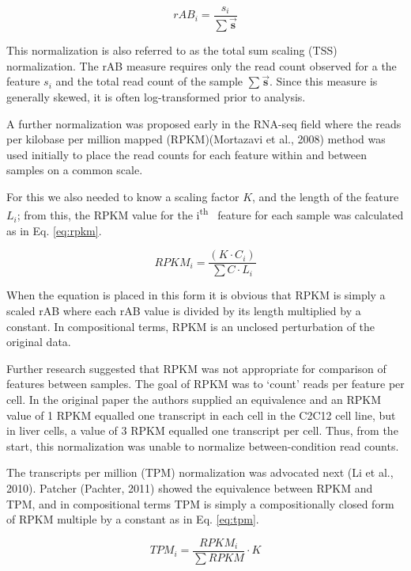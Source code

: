 \documentclass[twocolumn]{article}
\newcommand{\ith}[1]{ #1\textsuperscript{th}\ }
\begin{document}
\begin{equation}
    rAB_{i} = \frac{s_{i}}{\sum{\vec{\textbf{s}}}}
    \label{eq:rab}
\end{equation}

This normalization is also referred to as the total sum scaling (TSS)
normalization. The rAB measure requires only the read count observed for
a the feature \(s_i\) and the total read count of the sample
\(\sum{\vec{\textbf{s}}}\). Since this measure is generally skewed, it
is often log-transformed prior to analysis.

A further normalization was proposed early in the RNA-seq field where
the reads per kilobase per million mapped (RPKM)(Mortazavi et al., 2008)
method was used initially to place the read counts for each feature
within and between samples on a common scale.

For this we also needed to know a scaling factor \(K\), and the length
of the feature \(L_i\); from this, the RPKM value for the \ith{i}
feature for each sample was calculated as in Eq. \ref{eq:rpkm}.

\begin{equation}
    RPKM_{i} = \frac{(K \cdot C_{i} )}{\sum{C} \cdot L_{i}}
    \label{eq:rpkm}
\end{equation}

When the equation is placed in this form it is obvious that RPKM is
simply a scaled rAB where each rAB value is divided by its length
multiplied by a constant. In compositional terms, RPKM is an unclosed
perturbation of the original data.

Further research suggested that RPKM was not appropriate for comparison
of features between samples. The goal of RPKM was to `count' reads per
feature per cell. In the original paper the authors supplied an
equivalence and an RPKM value of 1 RPKM equalled one transcript in each
cell in the C2C12 cell line, but in liver cells, a value of 3 RPKM
equalled one transcript per cell. Thus, from the start, this
normalization was unable to normalize between-condition read counts.

The transcripts per million (TPM) normalization was advocated next (Li
et al., 2010). Patcher (Pachter, 2011) showed the equivalence between
RPKM and TPM, and in compositional terms TPM is simply a compositionally
closed form of RPKM multiple by a constant as in Eq. \ref{eq:tpm}.

\begin{equation}
    TPM_{i} = \frac{RPKM_i}{\sum{RPKM}} \cdot K
    \label{eq:tpm}
\end{equation}
\end{document}
